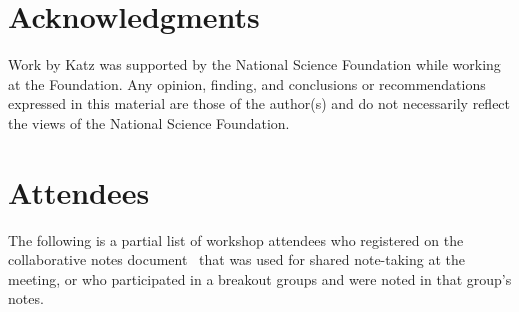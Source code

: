\documentclass[11pt, oneside]{amsart}
\newcommand{\todo}[1]{{\color{blue}$\blacksquare$~\textsf{[TODO: #1]}}}
\begin{document}
\section*{Acknowledgments} \label{sec:acks}

Work by Katz was supported by the National Science Foundation while working at
the Foundation. Any opinion, finding, and conclusions or recommendations
expressed in this material are those of the author(s) and do not necessarily
reflect the views of the National Science Foundation.



\appendix
\section{Attendees}  \label{sec:attendees}
The following is a partial list of workshop attendees who registered on the
collaborative notes document~\cite{WSSSPE2-google-notes} that was used
for shared note-taking at the meeting, or who participated in a breakout groups
and were noted in that group's notes.
\end{document}
